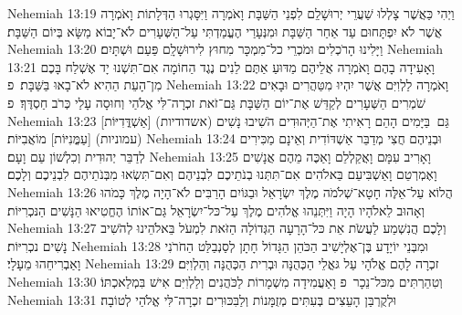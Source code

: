 Nehemiah 13:19	וַיְהִי כַּאֲשֶׁר צָלְלוּ שַׁעֲרֵי יְרוּשָׁלַ͏ִם לִפְנֵי הַשַּׁבָּת וָאֹמְרָה וַיִּסָּגְרוּ הַדְּלָתוֹת וָאֹמְרָה אֲשֶׁר לֹא יִפְתָּחוּם עַד אַחַר הַשַּׁבָּת וּמִנְּעָרַי הֶעֱמַדְתִּי עַל־הַשְּׁעָרִים לֹא־יָבוֹא מַשָּׂא בְּיוֹם הַשַּׁבָּת׃
Nehemiah 13:20	וַיָּלִינוּ הָרֹכְלִים וּמֹכְרֵי כל־מִמְכָּר מִחוּץ לִירוּשָׁלָ͏ִם פַּעַם וּשְׁתָּיִם׃
Nehemiah 13:21	וָאָעִידָה בָהֶם וָאֹמְרָה אֲלֵיהֶם מַדּוּעַ אַתֶּם לֵנִים נֶגֶד הַחוֹמָה אִם־תִּשְׁנוּ יָד אֶשְׁלַח בָּכֶם מִן־הָעֵת הַהִיא לֹא־בָאוּ בַּשַּׁבָּת׃ {פ}
Nehemiah 13:22	וָאֹמְרָה לַלְוִיִּם אֲשֶׁר יִהְיוּ מִטַּהֲרִים וּבָאִים שֹׁמְרִים הַשְּׁעָרִים לְקַדֵּשׁ אֶת־יוֹם הַשַּׁבָּת גַּם־זֹאת זכְרָה־לִּי אֱלֹהַי וְחוּסָה עָלַי כְּרֹב חַסְדֶּךָ׃ {פ}
Nehemiah 13:23	גַּם  בַּיָּמִים הָהֵם רָאִיתִי אֶת־הַיְּהוּדִים הֹשִׁיבוּ נָשִׁים (אשדודיות) [אַשְׁדֳּדִיּוֹת] (עמוניות) [עַמֳּנִיּוֹת] מוֹאֲבִיּוֹת׃
Nehemiah 13:24	וּבְנֵיהֶם חֲצִי מְדַבֵּר אַשְׁדּוֹדִית וְאֵינָם מַכִּירִים לְדַבֵּר יְהוּדִית וְכִלְשׁוֹן עַם וָעָם׃
Nehemiah 13:25	וָאָרִיב עִמָּם וָאֲקַלְלֵם וָאַכֶּה מֵהֶם אֲנָשִׁים וָאֶמְרְטֵם וָאַשְׁבִּיעֵם בֵּאלֹהִים אִם־תִּתְּנוּ בְנֹתֵיכֶם לִבְנֵיהֶם וְאִם־תִּשְׂאוּ מִבְּנֹתֵיהֶם לִבְנֵיכֶם וְלָכֶם׃
Nehemiah 13:26	הֲלוֹא עַל־אֵלֶּה חָטָא־שְׁלֹמֹה מֶלֶךְ יִשְׂרָאֵל וּבַגּוֹיִם הָרַבִּים לֹא־הָיָה מֶלֶךְ כָּמֹהוּ וְאָהוּב לֵאלֹהָיו הָיָה וַיִּתְּנֵהוּ אֱלֹהִים מֶלֶךְ עַל־כּל־יִשְׂרָאֵל גַּם־אוֹתוֹ הֶחֱטִיאוּ הַנָּשִׁים הַנּכְרִיּוֹת׃
Nehemiah 13:27	וְלָכֶם הֲנִשְׁמַע לַעֲשֹׂת אֵת כּל־הָרָעָה הַגְּדוֹלָה הַזֹּאת לִמְעֹל בֵּאלֹהֵינוּ לְהֹשִׁיב נָשִׁים נכְרִיּוֹת׃
Nehemiah 13:28	וּמִבְּנֵי יוֹיָדָע בֶּן־אֶלְיָשִׁיב הַכֹּהֵן הַגָּדוֹל חָתָן לְסַנְבַלַּט הַחֹרֹנִי וָאַבְרִיחֵהוּ מֵעָלָי׃
Nehemiah 13:29	זכְרָה לָהֶם אֱלֹהָי עַל גּאֳלֵי הַכְּהֻנָּה וּבְרִית הַכְּהֻנָּה וְהַלְוִיִּם׃
Nehemiah 13:30	וְטִהַרְתִּים מִכּל־נֵכָר {פ} וָאַעֲמִידָה מִשְׁמָרוֹת לַכֹּהֲנִים וְלַלְוִיִּם אִישׁ בִּמְלַאכְתּוֹ׃
Nehemiah 13:31	וּלְקֻרְבַּן הָעֵצִים בְּעִתִּים מְזֻמָּנוֹת וְלַבִּכּוּרִים זכְרָה־לִּי אֱלֹהַי לְטוֹבָה׃
